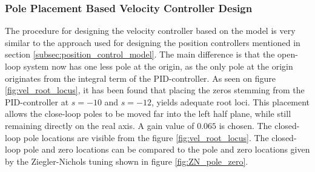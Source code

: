 \documentclass[../../main.tex]{subfiles}
\begin{document}






\subsubsection*{Pole Placement Based Velocity Controller Design}
The procedure for designing the velocity controller based on the model is very similar to the approach used for designing the position controllers mentioned in section \ref{subsec:position_control_model}. The main difference is that the open-loop system now has one less pole at the origin, as the only pole at the origin originates from the integral term of the PID-controller. As seen on figure \ref{fig:vel_root_locus}, it has been found that placing the zeros stemming from the PID-controller at $s = -10$ and $s = -12$, yields adequate root loci. This placement allows the close-loop poles to be moved far into the left half plane, while still remaining directly on the real axis. A gain value of $0.065$ is chosen. The closed-loop pole locations are visible from the figure \ref{fig:vel_root_locus}. The closed-loop pole and zero locations can be compared to the pole and zero locations given by the Ziegler-Nichols tuning shown in figure \ref{fig:ZN_pole_zero}.
\end{document}
